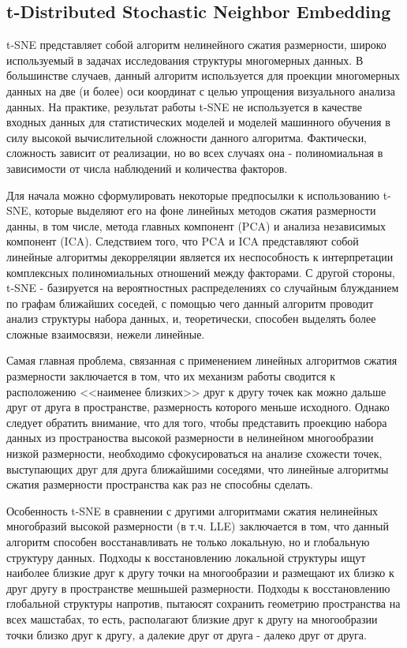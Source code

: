 \documentclass[runningheads]{llncs}
\begin{document}
\subsection{t-Distributed Stochastic Neighbor Embedding}
\hspace{0.4cm}
t-SNE представляет собой алгоритм нелинейного сжатия размерности, широко используемый в задачах исследования структуры многомерных данных. В большинстве случаев, данный алгоритм используется для проекции многомерных данных на две (и более) оси координат с целью упрощения визуального анализа данных. На практике, результат работы t-SNE не используется в качестве входных данных для статистических моделей и моделей машинного обучения в силу высокой вычислительной сложности данного алгоритма. Фактически, сложность зависит от реализации, но во всех случаях она - полиномиальная в зависимости от числа наблюдений и количества факторов. \par

Для начала можно сформулировать некоторые предпосылки к использованию t-SNE, которые выделяют его на фоне линейных методов сжатия размерности данны, в том числе, метода главных компонент (PCA) и анализа независимых компонент (ICA). Следствием того, что PCA и ICA представляют собой линейные алгоритмы декорреляции является их неспособность к интерпретации комплексных полиномиальных отношений между факторами. С другой стороны, t-SNE - базируется на вероятностных распределениях со случайным блужданием по графам ближайших соседей, с помощью чего данный алгоритм проводит анализ структуры набора данных, и, теоретически, способен выделять более сложные взаимосвязи, нежели линейные.\par

Самая главная проблема, связанная с применением линейных алгоритмов сжатия размерности заключается в том, что их механизм работы сводится к расположению <<наименее близких>> друг к другу точек как можно дальше друг от друга в пространстве, размерность которого меньше исходного. Однако следует обратить внимание, что для того, чтобы представить проекцию набора данных из пространоства высокой размерности в нелинейном многообразии низкой размерности, необходимо сфокусироваться на анализе схожести точек, выступающих друг для друга ближайшими соседями, что линейные алгоритмы сжатия размерности пространства как раз не способны сделать. \par

Особенность t-SNE в сравнении с другими алгоритмами сжатия нелинейных многобразий высокой размерности (в т.ч. LLE) заключается в том, что данный алгоритм способен восстанавливать не только локальную, но и глобальную структуру данных. Подходы к восстановлению локальной структуры ищут наиболее близкие друг к другу точки на многообразии и размещают их близко к друг другу в пространстве мешньшей размерности. Подходы к восстановлению глобальной структуры напротив, пытаюсят сохранить геометрию пространства на всех машстабах, то есть, располагают близкие друг к другу на многообразии точки близко друг к другу, а далекие друг от друга - далеко друг от друга. \par
\end{document}
